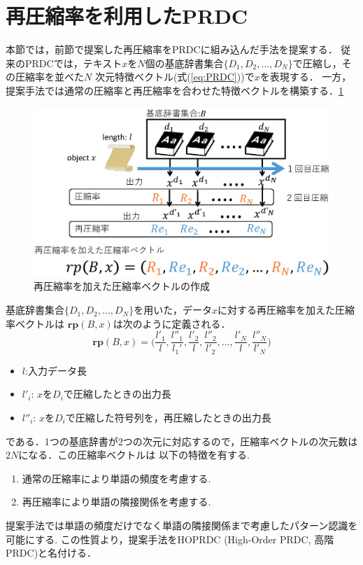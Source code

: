 \section{再圧縮率を利用したPRDC}
本節では，前節で提案した再圧縮率をPRDCに組み込んだ手法を提案する．
従来のPRDCでは，テキスト$x$を$N$個の基底辞書集合$\{D_1,D_2,\dots,D_N\}$で圧縮し，その圧縮率を並べた$N$
次元特徴ベクトル(式(\ref{eq:PRDC}))で$x$を表現する．
一方，提案手法では通常の圧縮率と再圧縮率を合わせた特徴ベクトルを構築する．\ref{fig:HOPRDC.eps}

\begin{figure}[tb]
\centering
\includegraphics[clip, width=\columnwidth]{image/HOPRDC.eps}
\caption{再圧縮率を加えた圧縮率ベクトルの作成}
\label{fig:HOPRDC.eps}
\end{figure}

基底辞書集合$\{D_1,D_2,\dots,D_N\}$を用いた，データ$x$に対する再圧縮率を加えた圧縮率ベクトルは
$\boldsymbol{rp}(B,x)$は次のように定義される．
\begin{equation}
\boldsymbol{rp}(B,x) = \biggl(\frac{l'_1}{l}, \frac{l''_1}{l_1'}, \frac{l'_2}{l}, \frac{l''_2}{l'_2}, \dots, \frac{l'_N}{l}, \frac{l''_N}{l'_N} \biggr)
\end{equation}
\begin{itemize}
	\item $l $:入力データ長
	\item $l'_i$: $x$を$D_i$で圧縮したときの出力長
	\item $l''_i$: $x$を$D_i$で圧縮した符号列を，再圧縮したときの出力長
\end{itemize}
である．1つの基底辞書が2つの次元に対応するので，圧縮率ベクトルの次元数は$2N$になる．この圧縮率ベクトルは
以下の特徴を有する.
\begin{enumerate}
	\item 通常の圧縮率により単語の頻度を考慮する.
	\item 再圧縮率により単語の隣接関係を考慮する.
\end{enumerate}
提案手法では単語の頻度だけでなく単語の隣接関係まで考慮したパターン認識を可能にする.
この性質より，提案手法をHOPRDC (High-Order PRDC, 高階PRDC)と名付ける．

